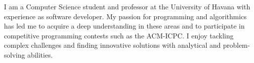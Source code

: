 
    I am a Computer Science student and professor at the University of Havana with experience as software developer. 
    My passion for programming and algorithmics has led me to acquire a deep understanding in these areas and to participate in 
    competitive programming contests such as the ACM-ICPC. I enjoy tackling complex challenges and finding innovative solutions 
    with analytical and problem-solving abilities.
    